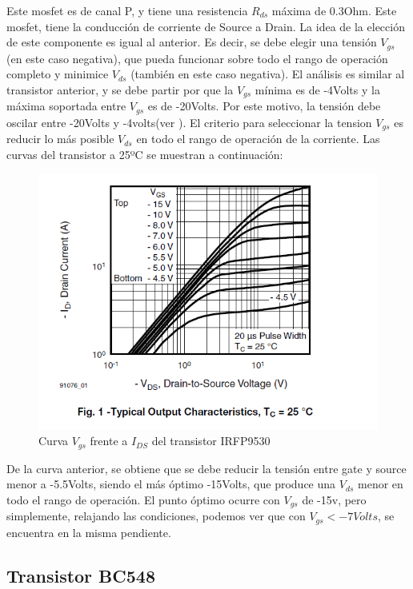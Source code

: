 Este mosfet es de canal P, y tiene una resistencia $R_{ds}$ máxima de 0.3Ohm. Este mosfet, tiene la conducción de corriente de Source a Drain. La idea de la elección de este componente es igual al anterior. Es decir, se debe elegir una tensión $V_{gs}$ (en este caso negativa), que pueda funcionar sobre todo el rango de operación completo y minimice $V_{ds}$ (también en este caso negativa). El análisis es similar al transistor anterior, y se debe partir por que la $V_{gs}$ mínima es de -4Volts y la máxima soportada entre $V_{gs}$ es de -20Volts. Por este motivo, la tensión debe oscilar entre -20Volts y -4volts(ver \cite{IRF9530}). 
El criterio para seleccionar la tension $V_{gs}$ es reducir lo más posible $V_{ds}$ en todo el rango de operación de la corriente. Las curvas del transistor a 25ºC se muestran a continuación: 

\begin{figure}[ht!] 
	\centering 
	\includegraphics{datasheet_irf9250}
	\caption{Curva $V_{gs}$ frente a $I_{DS}$ del transistor IRFP9530}
\end{figure}

De la curva anterior, se obtiene que se debe reducir la tensión entre gate y source menor a -5.5Volts, siendo el más óptimo -15Volts, que produce una $V_{ds}$ menor en todo el rango de operación. El punto óptimo ocurre con $V_{gs}$ de -15v, pero simplemente, relajando las condiciones, podemos ver que con $V_{gs} <-7Volts$, se encuentra en la misma pendiente.   



\subsection{Transistor BC548} 


